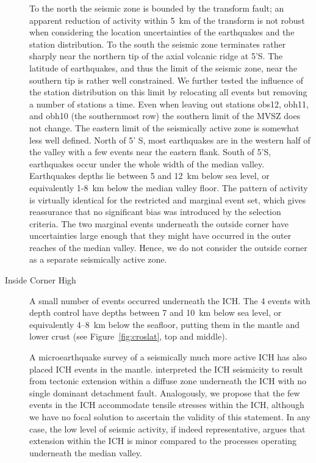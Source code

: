 \documentclass[aguplus]{aguplus}
\newlength{\tw}
\begin{document}
\begin{article}
\begin{description}
  To the north the seismic zone is
bounded by the transform fault; an apparent reduction of activity
within 5~km of the transform is not robust when considering the
location uncertainties of the earthquakes and the station
distribution. To the south the seismic zone terminates rather sharply near the
northern tip of the axial volcanic ridge at 5'S.  The latitude
of earthquakes, and thus the limit of the seismic zone,
 near the southern tip is rather well constrained.  We
further tested the influence of the station distribution on this limit
by relocating all events but removing a number of stations a time.
Even when leaving out stations obs12, obh11, and obh10 (the
southernmost row) the southern limit of the MVSZ
does not change.  The eastern limit of the seismically active zone is
somewhat less well defined.  North of 5' S, most earthquakes are
in the western half of the valley with a few events near the eastern
flank.  South of  5'S, earthquakes occur under the whole
width of the median valley. Earthquakes depths lie between 5 and 12~km
below sea level, or equivalently 1-8~km below the median valley floor.  The pattern
of activity is virtually identical for the restricted and marginal
event set, which gives reassurance that no significant bias was
introduced by the selection criteria.
  The two marginal events
underneath the outside corner have uncertainties large enough that
they might have occurred in the outer reaches of the median valley. Hence, we
do not consider the outside corner as a separate seismically
active zone.

\item[Inside Corner High]  A small number of events occurred
underneath the ICH.  The  4 events with depth control have depths
between 7 and 10~km below sea level, or equivalently 4--8~km
below the seafloor, putting them in the mantle and lower
crust (see Figure~\ref{fig:croslat}, top and middle).

A microearthquake survey of a  seismically much more active ICH
\citep[at 29\dg N,][]{wolfe95} has also placed ICH events in the
mantle.
\citet{wolfe95} interpreted the ICH
seismicity to result from tectonic extension within a
diffuse zone underneath the ICH with no single dominant detachment
fault.  Analogously, we propose that the few events in the ICH
accommodate tensile stresses within the ICH, although we have no focal solution to
ascertain the validity of this statement.  In any case, the low level
of seismic activity, if indeed representative, argues that extension
within the ICH is minor compared to the processes operating underneath the
median valley.


\end{description}
\end{article}
\end{document}

